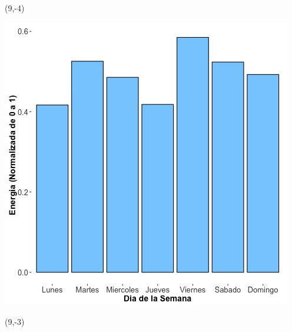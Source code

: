 \documentclass{article}\usepackage[]{graphicx}\usepackage[]{color}
\newenvironment{knitrout}{}{} %
\begin{document}
 \begin{textblock}{1}(9,-4)
\begin{minipage}{20em}
\begingroup

\endgroup
\end{minipage}
\end{textblock}


\begin{knitrout}
\color{fgcolor}
\includegraphics[scale=0.65]{figure/A29_day_of_week_plot} 
\end{knitrout}


 \begin{textblock}{1}(9,-3)
\begin{minipage}{20em}
\begingroup

\endgroup
\end{minipage}
\end{textblock}

 \vspace{2cm}
\end{document}
